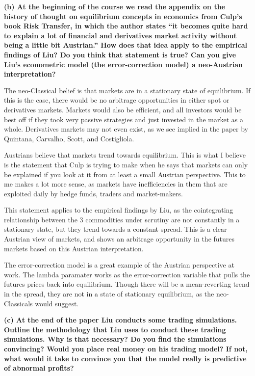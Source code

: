 \documentclass[11pt]{article}
\begin{document}
    \textbf{(b) At the beginning of the course we read the appendix on the
history of thought on equilibrium concepts in economics from Culp's book
Risk Transfer, in which the author states ``it becomes quite hard to
explain a lot of financial and derivatives market activity without being
a little bit Austrian.'' How does that idea apply to the empirical
findings of Liu? Do you think that statement is true? Can you give Liu's
econometric model (the error-correction model) a neo-Austrian
interpretation?}

    The neo-Classical belief is that markets are in a stationary state of
equilibrium. If this is the case, there would be no arbitrage
opportunities in either spot or derivatives markets. Markets would also
be efficient, and all investors would be best off if they took very
passive strategies and just invested in the market as a whole.
Derivatives markets may not even exist, as we see implied in the paper
by Quintana, Carvalho, Scott, and Costigliola.

Austrians believe that markets trend towards equilibrium. This is what I
believe is the statement that Culp is trying to make when he says that
markets can only be explained if you look at it from at least a small
Austrian perspective. This to me makes a lot more sense, as markets have
inefficiencies in them that are exploited daily by hedge funds, traders
and market-makers.

This statement applies to the empirical findings by Liu, as the
cointegrating relationship between the 3 commodities under scrutiny are
not constantly in a stationary state, but they trend towards a constant
spread. This is a clear Austrian view of markets, and shows an arbitrage
opportunity in the futures markets based on this Austrian
interpretation.

The error-correction model is a great example of the Austrian
perspective at work. The lambda paramater works as the error-correction
variable that pulls the futures prices back into equilibrium. Though
there will be a mean-reverting trend in the spread, they are not in a
state of stationary equilibrium, as the neo-Classicals would suggest.

    \textbf{(c) At the end of the paper Liu conducts some trading
simulations. Outline the methodology that Liu uses to conduct these
trading simulations. Why is that necessary? Do you find the simulations
convincing? Would you place real money on his trading model? If not,
what would it take to convince you that the model really is predictive
of abnormal profits?}
\end{document}
